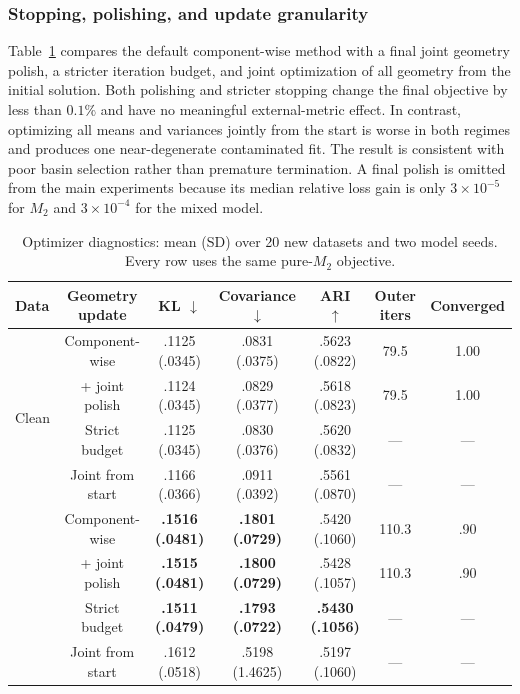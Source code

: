 \documentclass[11pt,a4paper]{article}
\newcommand{\best}[1]{\textbf{#1}}
\newcommand{\Mtwo}{M_2}
\begin{document}
\subsubsection{Stopping, polishing, and update granularity}

Table~\ref{tab:optimizer_standard} compares the default component-wise method
with a final joint geometry polish, a stricter iteration budget, and joint
optimization of all geometry from the initial solution.  Both polishing and
stricter stopping change the final objective by less than $0.1\%$ and have no
meaningful external-metric effect.  In contrast, optimizing all means and
variances jointly from the start is worse in both regimes and produces one
near-degenerate contaminated fit.  The result is consistent with poor basin
selection rather than premature termination.  A final polish is omitted from
the main experiments because its median relative loss gain is only
$3\times10^{-5}$ for $\Mtwo$ and $3\times10^{-4}$ for the mixed model.

\begin{table}[ht]
\centering
\scriptsize
\caption{Optimizer diagnostics: mean (SD) over 20 new datasets and two model
seeds.  Every row uses the same pure-$\Mtwo$ objective.}
\label{tab:optimizer_standard}
\begin{tabular}{@{}l c c c c c c@{}}
\toprule
Data & Geometry update & KL $\downarrow$ & Covariance $\downarrow$ & ARI $\uparrow$
 & Outer iters & Converged \\
\midrule
\multirow{4}{*}{Clean}
 & Component-wise & .1125 (.0345) & .0831 (.0375) & .5623 (.0822) & 79.5 & 1.00 \\
 & + joint polish & .1124 (.0345) & .0829 (.0377) & .5618 (.0823) & 79.5 & 1.00 \\
 & Strict budget & .1125 (.0345) & .0830 (.0376) & .5620 (.0832) & --- & --- \\
 & Joint from start & .1166 (.0366) & .0911 (.0392) & .5561 (.0870) & --- & --- \\
\addlinespace
\multirow{4}{*}{$5\%$ uniform}
 & Component-wise & \best{.1516 (.0481)} & \best{.1801 (.0729)} & .5420 (.1060) & 110.3 & .90 \\
 & + joint polish & \best{.1515 (.0481)} & \best{.1800 (.0729)} & .5428 (.1057) & 110.3 & .90 \\
 & Strict budget & \best{.1511 (.0479)} & \best{.1793 (.0722)} & \best{.5430 (.1056)} & --- & --- \\
 & Joint from start & .1612 (.0518) & .5198 (1.4625) & .5197 (.1060) & --- & --- \\
\bottomrule
\end{tabular}
\end{table}
\end{document}
